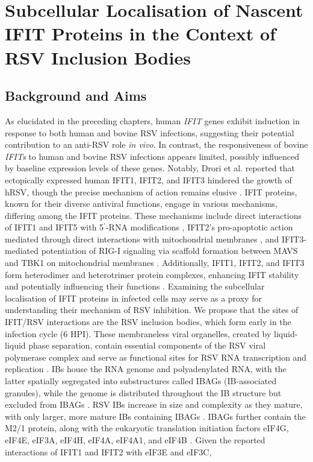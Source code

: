 \chapter{Subcellular Localisation of Nascent IFIT Proteins in the Context of RSV Inclusion Bodies} \label{ch:Subcellular Localisation of Nascent IFIT Proteins in the Context of RSV Inclusion Bodies}
\section{Background and Aims} \label{sec:Background and Aims-Chapter3}
As elucidated in the preceding chapters, human \textit{IFIT} genes exhibit induction in response to both human and bovine RSV infections, suggesting their potential contribution to an anti-RSV role \textit{in vivo}. In contrast, the responsiveness of bovine \textit{IFITs} to human and bovine RSV infections appears limited, possibly influenced by baseline expression levels of these genes. Notably, Drori et al. reported that ectopically expressed human IFIT1, IFIT2, and IFIT3 hindered the growth of hRSV, though the precise mechanism of action remains elusive \cite{Drori2020InfluenzaProteins}. IFIT proteins, known for their diverse antiviral functions, engage in various mechanisms, differing among the IFIT proteins. These mechanisms include direct interactions of IFIT1 and IFIT5 with 5$^{\prime}$-RNA modifications \cite{Abbas2013StructuralProteins, Diamond2014IFIT1:Translation}, IFIT2's pro-apoptotic action mediated through direct interactions with mitochondrial membranes \cite{Chen2017InhibitionApoptosis}, and IFIT3-mediated potentiation of RIG-I signaling via scaffold formation between MAVS and TBK1 on mitochondrial membranes \cite{Liu2011IFN-InducedTBK1}. Additionally, IFIT1, IFIT2, and IFIT3 form heterodimer and heterotrimer protein complexes, enhancing IFIT stability and potentially influencing their functions \cite{Mears2018BetterResponse}. Examining the subcellular localisation of IFIT proteins in infected cells may serve as a proxy for understanding their mechanism of RSV inhibition. We propose that the sites of IFIT/RSV interactions are the RSV inclusion bodies, which form early in the infection cycle (6 HPI). These membraneless viral organelles, created by liquid-liquid phase separation, contain essential components of the RSV viral polymerase complex and serve as functional sites for RSV RNA transcription and replication \cite{Rincheval2017FunctionalVirus, Weber1995NonstructuralSerum, Fricke2013P38Assembly, Jobe2021BovineResponses}. IBs house the RNA genome and polyadenylated RNA, with the latter spatially segregated into substructures called IBAGs (IB-associated granules), while the genome is distributed throughout the IB structure but excluded from IBAGs \cite{Rincheval2017FunctionalVirus}. RSV IBs increase in size and complexity as they mature, with only larger, more mature IBs containing IBAGs \cite{Rincheval2017FunctionalVirus, Jobe2021BovineResponses}. IBAGs further contain the M2/1 protein, along with the eukaryotic translation initiation factors eIF4G, eIF4E, eIF3A, eIF4H, eIF4A, eIF4A1, and eIF4B \cite{Rincheval2017FunctionalVirus, Jobe2023ViralCondensates}. Given the reported interactions of IFIT1 and IFIT2 with eIF3E and eIF3C, 